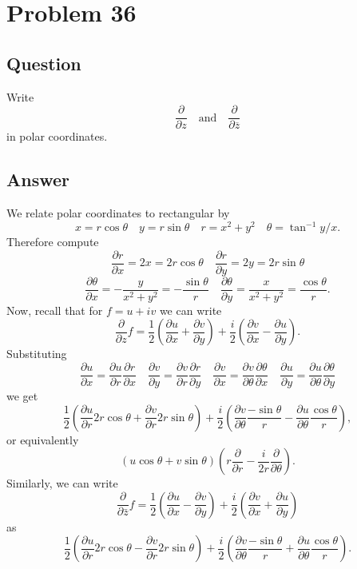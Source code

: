 \documentclass[11pt]{article}
\begin{document}
\section{Problem  36}
\subsection{Question}
Write
\[ \frac{\partial}{\partial z} \quad\mbox{and}\quad \frac{\partial}{\partial \overline{z}}\]
in polar coordinates.
\subsection{Answer}
We relate polar coordinates to rectangular by 
\[x = r \cos \theta \quad y = r \sin \theta  \quad r = x^2 + y^2 \quad \theta = \tan^{-1} y/x.\]
Therefore compute
\[\frac{\partial r}{\partial x} = 2 x = 2 r  \cos \theta \quad\frac{\partial r}{\partial y} = 2 y = 2 r \sin \theta \]
\[\frac{\partial \theta}{\partial x} = -\frac{y}{x^2 + y^2} = -\frac{ \sin \theta }{ r} \quad \frac{\partial \theta}{\partial y} = \frac{x}{ x^2 + y^2}  = \frac{\cos \theta}{r} .\]
Now, recall that for $f = u +  i v $ we can write
\[\frac{\partial}{\partial z} f = \frac{1}{2} \left( \frac{\partial u }{\partial x} + \frac{\partial v }{\partial y} \right) + \frac{i}{2} \left( \frac{\partial v}{\partial x} - \frac{\partial u}{\partial y}  \right) .\]
Substituting
\[\frac{\partial u}{ \partial x}= \frac{\partial u}{\partial r} \frac{\partial r}{\partial x}\quad\frac{\partial v}{ \partial y}= \frac{\partial v}{\partial r} \frac{\partial r}{\partial y}\quad\frac{\partial v}{ \partial x}= \frac{\partial v} {\partial \theta} \frac{\partial \theta}{\partial x}\quad\frac{\partial u}{ \partial y}= \frac{\partial u}{\partial \theta} \frac{\partial \theta}{\partial y}\]
we get
\[ \frac{1}{2} \left( \frac{\partial u }{\partial r} 2 r \cos \theta + \frac{\partial v }{\partial r} 2 r \sin \theta \right) + \frac{i}{2} \left( \frac{\partial v}{\partial \theta} \frac{-\sin \theta}{r} - \frac{\partial u}{\partial \theta}  \frac{\cos \theta}{r} \right) ,\]
or equivalently
\[(u \cos \theta + v \sin \theta)\left( r \frac{\partial}{\partial r} - \frac{i}{2r} \frac{\partial }{\partial \theta} \right).\]
Similarly, we can write 
\[\frac{\partial}{\partial \bar z} f = \frac{1}{2} \left( \frac{\partial u }{\partial x} - \frac{\partial v }{\partial y} \right) + \frac{i}{2} \left( \frac{\partial v}{\partial x} + \frac{\partial u}{\partial y}  \right) \]
as
\[ \frac{1}{2} \left( \frac{\partial u }{\partial r} 2 r \cos \theta - \frac{\partial v }{\partial r} 2 r \sin \theta \right) + \frac{i}{2} \left( \frac{\partial v}{\partial \theta} \frac{-\sin \theta}{r} + \frac{\partial u}{\partial \theta}  \frac{\cos \theta}{r} \right) .\]
\end{document}
